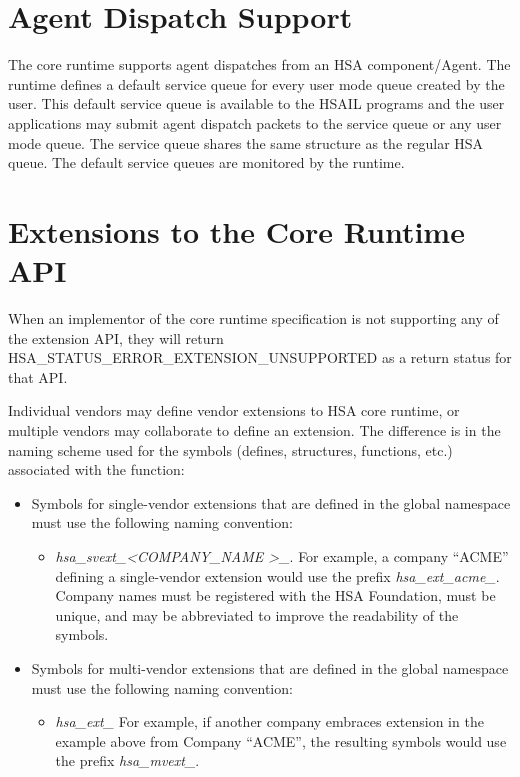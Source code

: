 \documentclass[final]{book}
\newcommand{\reftyp}[1]{#1}
\newcommand{\refenu}[1]{\reftyp{#1}}
\begin{document}

% 

\hypertarget{agent}{}\section{Agent Dispatch Support}\label{agent}

The core runtime supports agent dispatches from an HSA component/Agent. The
runtime defines a default service queue for every user mode queue created by the
user. This default service queue is available to the HSAIL programs and the user
applications may submit agent dispatch packets to the service queue or any user
mode queue. The service queue shares the same structure as the regular HSA
queue. The default service queues are monitored by the
runtime. 


\hypertarget{extensions}{}\section{Extensions to the Core Runtime
  API}\label{extensions}

When an implementor of the core runtime specification is not supporting any of
the extension API, they will return
\refenu{HSA_STATUS_ERROR_EXTENSION_UNSUPPORTED} as a return status for that API.

Individual vendors may define vendor extensions to HSA core runtime, or multiple
vendors may collaborate to define an extension. The difference is in the naming
scheme used for the symbols (defines, structures, functions, etc.) associated
with the function:

\begin{itemize}
\item Symbols for single-vendor extensions that are defined in the global
  namespace must use the following naming convention:
  \begin{itemize}
  \item \emph{hsa_svext_\textless COMPANY_NAME \textgreater_}. For example,
    a company ``ACME'' defining a single-vendor extension would use the prefix
    \emph{hsa_ext_acme_}. Company names must be registered with the HSA
    Foundation, must be unique, and may be abbreviated to improve the
    readability of the symbols.
  \end{itemize}
\item Symbols for multi-vendor extensions that are defined in the global
  namespace must use the following naming convention:
  \begin{itemize}
  \item \emph{hsa_ext_} For example, if another company embraces extension in
    the example above from Company ``ACME'', the resulting symbols would use the
    prefix \emph{hsa_mvext_}.
  \end{itemize}
\end{itemize}
\end{document}
